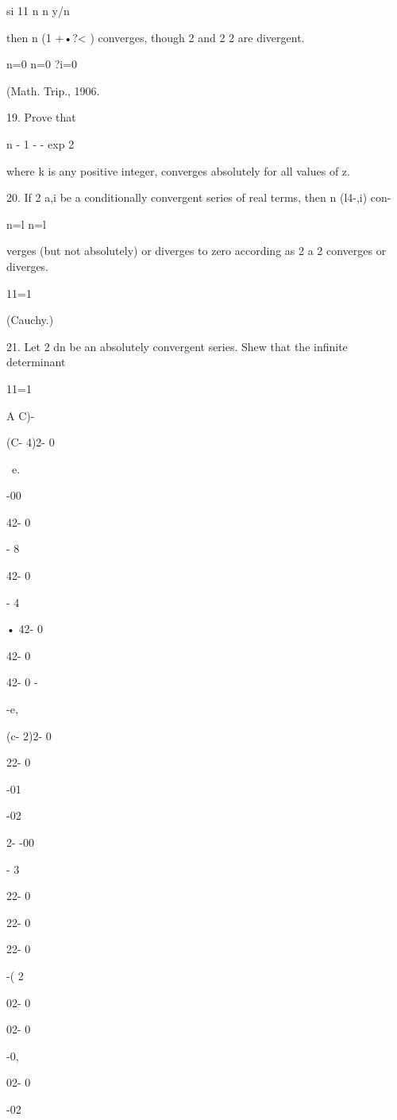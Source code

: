 si 11 n n y/n



then n (1 +•?< ) converges, though 2 and 2 2 are divergent.

n=0 n=0 ?i=0



(Math. Trip., 1906.



19. Prove that



n - 1 - - exp 2



where k is any positive integer, converges absolutely for all values
of z.

20. If 2 a,i be a conditionally convergent series of real terms, then
n (l4-,i) con-

n=l n=l

verges (but not absolutely) or diverges to zero according as 2 a 2
converges or diverges.

11=1

(Cauchy.)

21. Let 2 dn be an absolutely convergent series. Shew that the
infinite determinant

11=1

A C)-



(C- 4)2- 0


~e.


-00

42- 0


- 8

42- 0


- 4


  • 42- 0


42- 0


42- 0 -


-e,


(c- 2)2- 0

22- 0


-01


-02

2- -00


- 3


    22- 0


22- 0


22- 0


-( 2


02- 0


02- 0


-0,

02- 0


-02


